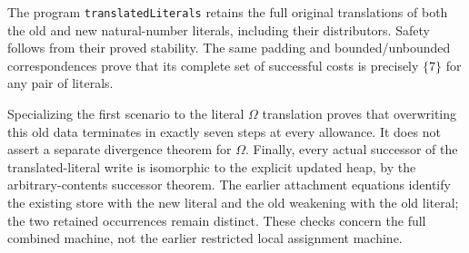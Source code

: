 

The program \texttt{translatedLiterals} retains the full original
translations of both the old and new natural-number literals, including
their distributors. Safety follows from their proved stability. The same
padding and bounded/unbounded correspondences prove that its complete set
of successful costs is precisely $\{7\}$ for any pair of literals.



Specializing the first scenario to the literal $\Omega$ translation proves
that overwriting this old data terminates in exactly seven steps at every
allowance. It does not assert a separate divergence theorem for $\Omega$.
Finally, every actual successor of the translated-literal write is isomorphic
to the explicit updated heap, by the arbitrary-contents successor theorem.
The earlier attachment equations identify the existing store with the new
literal and the old weakening with the old literal; the two retained
occurrences remain distinct. These checks concern the full combined machine,
not the earlier restricted local assignment machine.


